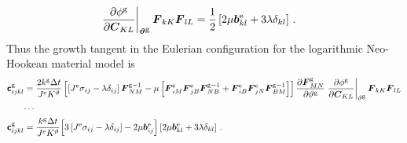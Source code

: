 \documentclass[10pt,letterpaper,oneside]{report}
\newcommand{\ten}[1]{\mbox{\boldmath $#1$}{}}
\newcommand{\tenf}[1]{\mbox{{\sffamily{\bfseries {#1}}}}}
\newcommand{\scas}[1]{\mbox{{\scriptsize{${\rm{#1}}$}}}{}}
\newcommand{\tens}[1]{\mbox{\boldmath{\scriptsize{$#1$}}}{}}
\begin{document}
\begin{itemize}
\begin{align}
\left. \frac{\partial \phi^{\scas{g}} }{\partial \ten{C}_{KL}} \right|_{\tens{\vartheta}^{\scas{g}}} \ten{F}_{kK} \ten{F}_{lL} 
={}& \frac{1}{2} \left[ 2 \mu \ten{b}^{\scas{e}}_{kl} + 3 \lambda \delta_{kl} \right] \, . 
\end{align}
Thus the growth tangent in the Eulerian configuration for the logarithmic Neo-Hookean material model is 
\begin{align}
\tenf{c}^{\scas{g}}_{ijkl} 
={}& \frac{2 k^{\scas{g}} \Delta t}{J^{\scas{e}} K^\vartheta} \left[ \left[ J^{\scas{e}} \sigma_{ij} - \lambda \delta_{ij} \right] \ten{F}^{\scas{g}-1}_{NM} 
- \mu \left[ \ten{F}^{\scas{e}}_{iM} \ten{F}^{\scas{e}}_{jB} \ten{F}^{\scas{g}-1}_{NB} + \ten{F}^{\scas{e}}_{iB} \ten{F}^{\scas{e}}_{jN} \ten{F}^{\scas{g}-1}_{BM} \right] \right] 
\frac{\partial \ten{F}^{\scas{g}}_{MN}}{\partial \vartheta^{\scas{g}}} \left. \frac{\partial \phi^{\scas{g}} }{\partial \ten{C}_{KL}} \right|_{\vartheta^{\scas{g}}} \ten{F}_{kK} \ten{F}_{lL} 
\\
\cdots{}& \notag \\
\tenf{c}^{\scas{g}}_{ijkl} 
={}& \frac{ k^{\scas{g}} \Delta t}{J^{\scas{e}} K^\vartheta} \Big[ 3 \left[ J^{\scas{e}} \sigma_{ij} - \lambda \delta_{ij} \right] 
- 2 \mu \ten{b}^{\scas{e}}_{ij} \Big] 
\left[ 2 \mu \ten{b}^{\scas{e}}_{kl} + 3 \lambda \delta_{kl} \right] \, .  
\end{align}



\end{itemize}
\end{document}
